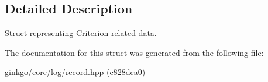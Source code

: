 \subsection{Detailed Description}
Struct representing Criterion related data. 

The documentation for this struct was generated from the following file\+:\begin{DoxyCompactItemize}
\item 
ginkgo/core/log/record.\+hpp (c828dca0)\end{DoxyCompactItemize}
